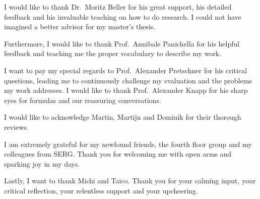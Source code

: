 \documentclass[\myrootdir/main.tex]{subfiles}
\begin{document}
\thispagestyle{empty}

\vspace*{2cm}

\begin{center}
{ \myAcknowTitle}
\end{center}

\vspace{1cm}
\noindent
I would like to thank Dr.\ Moritz Beller for his great support, his detailed feedback and his invaluable teaching on how to do research.
I could not have imagined a better advisor for my master's thesis.

\noindent
Furthermore, I would like to thank Prof.\ Annibale Panichella for his helpful feedback and teaching me the proper vocabulary to describe my work.

\noindent
I want to pay my special regards to Prof.\ Alexander Pretschner for his critical questions, leading me to continuously challenge my evaluation and the problems my work addresses.
I would like to thank Prof.\ Alexander Knapp for his sharp eyes for formulas and our reassuring conversations.

\noindent
I would like to acknowledge Martin, Martijn and Dominik for their thorough reviews.

\noindent
I am extremely grateful for my newfound friends, the fourth floor group and my colleagues from SERG.
Thank you for welcoming me with open arms and sparking joy in my days.

\noindent
Lastly, I want to thank Michi and Taico.
Thank you for your calming input, your critical reflection, your relentless support and your upcheering.

\end{document}
